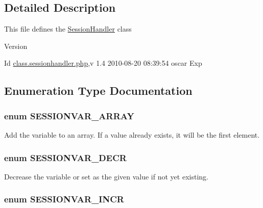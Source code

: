\subsection{Detailed Description}
This file defines the \hyperlink{classSessionHandler}{SessionHandler} class \begin{DoxyVersion}{Version}

\end{DoxyVersion}
\begin{DoxyParagraph}{Id}
\hyperlink{class_8sessionhandler_8php}{class.sessionhandler.php},v 1.4 2010-\/08-\/20 08:39:54 oscar Exp 
\end{DoxyParagraph}


\subsection{Enumeration Type Documentation}
\subsubsection[{SESSIONVAR\_\-ARRAY}]{\setlength{\rightskip}{0pt plus 5cm}enum {\bf SESSIONVAR\_\-ARRAY}}\label{class_8sessionhandler_8php_a37ebf617beca75ce8d60f06b8c37423a}


Add the variable to an array. If a value already exists, it will be the first element. 

\subsubsection[{SESSIONVAR\_\-DECR}]{\setlength{\rightskip}{0pt plus 5cm}enum {\bf SESSIONVAR\_\-DECR}}\label{class_8sessionhandler_8php_a25d82db99af8d3372efbccb0917f33cb}


Decrease the variable or set as the given value if not yet existing. 

\subsubsection[{SESSIONVAR\_\-INCR}]{\setlength{\rightskip}{0pt plus 5cm}enum {\bf SESSIONVAR\_\-INCR}}\label{class_8sessionhandler_8php_acf42fdbedc1bd30daaebadb12f63c75c}



